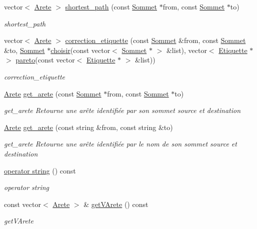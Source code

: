 \begin{DoxyCompactItemize}
vector$<$ \hyperlink{class_arete}{Arete} $>$ \hyperlink{class_graphe_a334dcf698d519f22f276eda6d846a3de}{shortest\+\_\+path} (const \hyperlink{class_sommet}{Sommet} $\ast$from, const \hyperlink{class_sommet}{Sommet} $\ast$to)
\begin{DoxyCompactList}\small\item\em shortest\+\_\+path \end{DoxyCompactList}\item 
vector$<$ \hyperlink{class_arete}{Arete} $>$ \hyperlink{class_graphe_a39712d656bf8d7dbafbea4e0207565b3}{correction\+\_\+etiquette} (const \hyperlink{class_sommet}{Sommet} \&from, const \hyperlink{class_sommet}{Sommet} \&to, \hyperlink{class_sommet}{Sommet} $\ast$\hyperlink{tools_8h_a677f6c8bffe4adb8d9d7359fdc40b142}{choisir}(const vector$<$ \hyperlink{class_sommet}{Sommet} $\ast$ $>$ \&list), vector$<$ \hyperlink{class_etiquette}{Etiquette} $\ast$ $>$ \hyperlink{tools_8h_a17cb87cf06a7862e3e44efe3ecdfb2fc}{pareto}(const vector$<$ \hyperlink{class_etiquette}{Etiquette} $\ast$ $>$ \&list))
\begin{DoxyCompactList}\small\item\em correction\+\_\+etiquette \end{DoxyCompactList}\item 
\hyperlink{class_arete}{Arete} \hyperlink{class_graphe_a861e0c116f27493b176961bcb6daceee}{get\+\_\+arete} (const \hyperlink{class_sommet}{Sommet} $\ast$from, const \hyperlink{class_sommet}{Sommet} $\ast$to)
\begin{DoxyCompactList}\small\item\em get\+\_\+arete Retourne une arête identifiée par son sommet source et destination \end{DoxyCompactList}\item 
\hyperlink{class_arete}{Arete} \hyperlink{class_graphe_a048f84fc486a15cd69aad96fb93af08e}{get\+\_\+arete} (const string \&from, const string \&to)
\begin{DoxyCompactList}\small\item\em get\+\_\+arete Retourne une arête identifiée par le nom de son sommet source et destination \end{DoxyCompactList}\item 
\hyperlink{class_graphe_ac1174e4197d1a548bbaae047be13d61b}{operator string} () const 
\begin{DoxyCompactList}\small\item\em operator string \end{DoxyCompactList}\item 
const vector$<$ \hyperlink{class_arete}{Arete} $>$ \& \hyperlink{class_graphe_a43393cce73c8dba322682245585292e8}{get\+V\+Arete} () const 
\begin{DoxyCompactList}\small\item\em get\+V\+Arete \end{DoxyCompactList}\end{DoxyCompactItemize}
